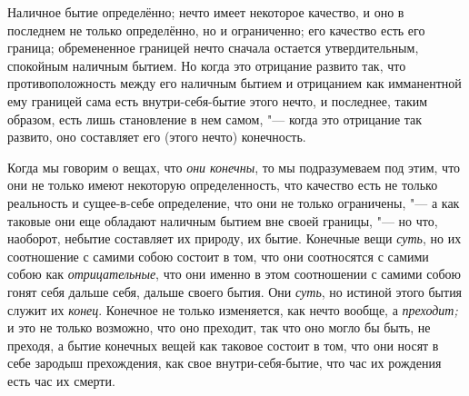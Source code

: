 Наличное бытие определённо; нечто имеет некоторое качество, и оно в последнем
не только определённо, но и ограниченно; его качество есть его граница;
обремененное границей нечто сначала остается утвердительным, спокойным
наличным бытием. Но когда это отрицание развито так, что противоположность
между его наличным бытием и отрицанием как имманентной ему границей сама
есть внутри-себя-бытие этого нечто, и последнее, таким образом, есть лишь
становление в нем самом, "--- когда это отрицание так развито, оно составляет
его (этого нечто) конечность.

Когда мы говорим о вещах, что {\em они конечны}, то мы
подразумеваем под этим, что они не только имеют некоторую определенность,
что качество есть не только реальность и сущее-в-себе определение, что они не
только ограничены, "--- а как таковые они еще обладают наличным бытием вне
своей границы, "--- но что, наоборот, небытие составляет их природу, их бытие.
Конечные вещи {\em суть}, но их соотношение с самими
собою состоит в том, что они соотносятся с самими собою как
{\em отрицательные}, что они именно в этом соотношении
с самими собою гонят себя дальше себя, дальше своего бытия. Они
{\em суть}, но истиной этого бытия служит их
{\em конец}. Конечное не только изменяется, как нечто
вообще, а {\em преходит;} и это не только возможно, что
оно преходит, так что оно могло бы быть, не преходя, а бытие конечных вещей
как таковое состоит в том, что они носят в себе зародыш прехождения, как
свое внутри-себя-бытие, что час их рождения есть час их смерти.


